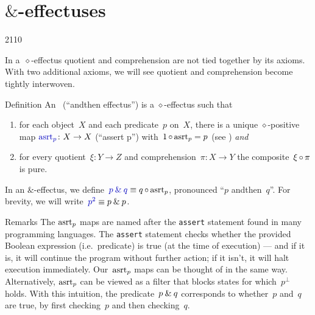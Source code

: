 \section{$\&$-effectuses}
\begin{parsec}{2110}%
\begin{point}{10}%
In a~$\diamond$-effectus
    quotient and comprehension are not tied together by its axioms.
    With two additional axioms, we will see quotient and comprehension
    become tightly interwoven.
\end{point}
\begin{point}{20}{Definition}%
An~ (``andthen effectus'')
is a $\diamond$-effectus
such that
\begin{enumerate}
\item
    for each object~$X$
    and each predicate~$p$ on~$X$,
        there is a unique $\diamond$-positive
        map $\Define{\asrt_p}\colon X \to X$
        (``assert p'')
        with~$1 \mathop{\circ} \mathrm{asrt}_p = p$ (see )
        \emph{and}
\item
    for every quotient~$\xi \colon Y \to Z$
    and comprehension~$\pi \colon X \to Y$
    the composite~$\xi \mathop{\circ} \pi$ is pure.
\end{enumerate}
In an $\&$-effectus,
we define~$\Define{\andthen{p}{q}} \equiv q \after \asrt_p$,
    pronounced ``$p$ andthen~$q$''.
For brevity, we will write~$\Define{p^2} \equiv \andthen{p}{p}$.
\begin{point}{30}{Remarks}%
The $\mathrm{asrt}_p$ maps are named after the \texttt{assert} statement
    found in many programming languages.
The \texttt{assert} statement checks whether
    the provided Boolean expression (i.e.~predicate)
    is true (at the time of execution) --- and if it is, it will continue the program
    without further action; if it isn't, it will halt execution
    immediately.
Our~$\mathrm{asrt}_p$ maps can be thought of in the same way.
Alternatively, $\mathrm{asrt}_p$ can be viewed as a filter
    that blocks states for which~$p^\perp$ holds.
With this intuition,
    the predicate~$p \mathbin{\&} q$
    corresponds to whether~$p$ and~$q$ are true,
    by first checking~$p$ and then checking~$q$.


\end{point}
\end{point}
\end{parsec}
